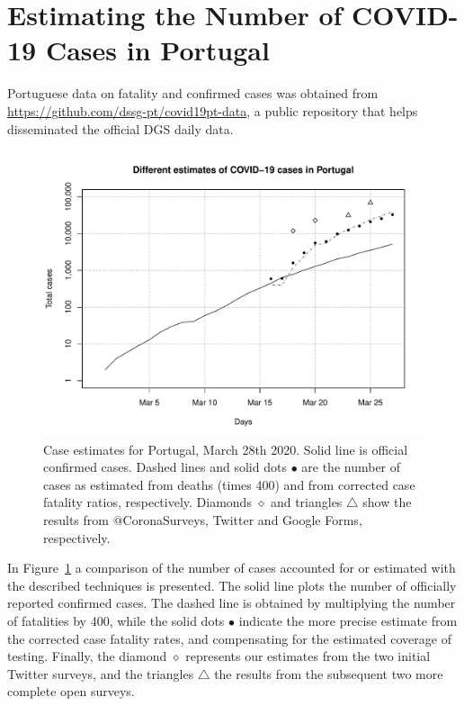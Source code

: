 \documentclass{article}
\begin{document}
\section{Estimating the Number of COVID-19 Cases in Portugal}

Portuguese data on fatality and confirmed cases was obtained from \url{https://github.com/dssg-pt/covid19pt-data}, a public repository that helps disseminated the official DGS daily data.

\begin{figure}
\begin{center}
\includegraphics[width=0.9\linewidth]{EstPTMar28.pdf}
\end{center}
  \caption{Case estimates for Portugal, March 28th 2020. Solid line is official confirmed cases. Dashed lines and solid dots $\bullet$ are the number of cases as estimated from deaths (times 400) and from corrected case fatality ratios, respectively. Diamonds $\diamond$ and triangles  $\triangle$ show the results from $@$CoronaSurveys, Twitter and Google Forms, respectively.}
\label{pt}
\end{figure}

In Figure~\ref{pt} a comparison of the number of cases accounted for or estimated with the described techniques is presented. The solid line plots the number of officially reported confirmed cases. The dashed line is obtained by multiplying the number of fatalities by 400, while the solid dots $\bullet$ indicate the more precise estimate from the corrected case fatality rates, and compensating for the estimated coverage of testing. Finally, the diamond $\diamond$ represents our estimates from the two initial Twitter surveys, and the triangles $\triangle$ the results from the subsequent two more complete open surveys. 
\end{document}
